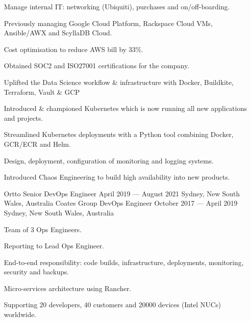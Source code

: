 \begin{experiences}
{\begin{cvitems}
      \item {Manage internal IT: networking (Ubiquiti), purchases and on/off-boarding.}
      \item {Previously managing Google Cloud Platform, Rackspace Cloud VMs, Ansible/AWX and ScyllaDB Cloud.}
    \end{cvitems}
  }
  {
    \begin{cvitems}
      \item {Cost optimisation to reduce AWS bill by 33\%.}
      \item {Obtained SOC2 and ISO27001 certifications for the company.}
      \item {Uplifted the Data Science workflow \& infrastructure with Docker, Buildkite, Terraform, Vault \& GCP}
      \item {Introduced \& championed Kubernetes which is now running all new applications and projects.}
      \item {Streamlined Kubernetes deployments with a Python tool combining Docker, GCR/ECR and Helm.}
      \item {Design, deployment, configuration of monitoring and logging systems.}
      \item {Introduced Chaos Engineering to build high availability into new products.}
    \end{cvitems}
  }
  \expitem
  {Ortto} %
  {Senior DevOps Engineer} %
  {April 2019 --- August 2021} %
  {Sydney, New South Wales, Australia} %
  {} %
  {} %
  {} %
  \expitem
  {Coates Group} %
  {DevOps Engineer} %
  {October 2017 --- April 2019} %
  {Sydney, New South Wales, Australia} %
  {
    \begin{cvitems}
      \item {Team of 3 Ops Engineers.}
      \item {Reporting to Lead Ops Engineer.}
      \item {End-to-end responsibility: code builds, infrastructure, deployments, monitoring, security and backups.}
      \item {Micro-services architecture using Rancher.}
      \item {Supporting 20 developers, 40 customers and 20000 devices (Intel NUCs) worldwide.}
    \end{cvitems}
  }

\end{experiences}
